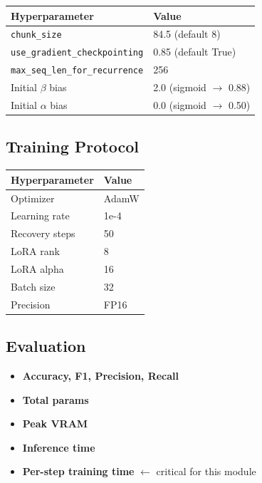 \begin{table}[H]
\centering
\small
\begin{tabular}{ll}
\toprule
\textbf{Hyperparameter} & \textbf{Value} \\
\midrule
\texttt{chunk\_size} & 84.5 (default 8) \\
\texttt{use\_gradient\_checkpointing} & 0.85 (default True) \\
\texttt{max\_seq\_len\_for\_recurrence} & 256 \\
Initial $\beta$ bias & 2.0 (sigmoid $\to$ 0.88) \\
Initial $\alpha$ bias & 0.0 (sigmoid $\to$ 0.50) \\
\bottomrule
\end{tabular}
\end{table}

\subsection{Training Protocol}

\begin{table}[H]
\centering
\small
\begin{tabular}{ll}
\toprule
\textbf{Hyperparameter} & \textbf{Value} \\
\midrule
Optimizer & AdamW \\
Learning rate & 1e-4 \\
Recovery steps & 50 \\
LoRA rank & 8 \\
LoRA alpha & 16 \\
Batch size & 32 \\
Precision & FP16 \\
\bottomrule
\end{tabular}
\end{table}

\subsection{Evaluation}

\begin{itemize}
\item \textbf{Accuracy, F1, Precision, Recall}
\item \textbf{Total params}
\item \textbf{Peak VRAM}
\item \textbf{Inference time}
\item \textbf{Per-step training time} $\leftarrow$ critical for this module

\end{itemize}
